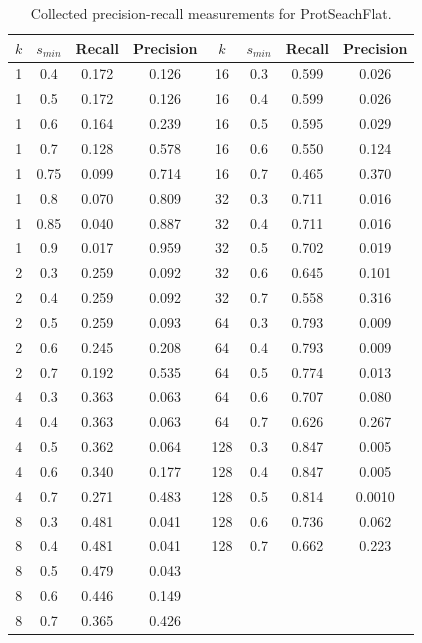 \documentclass[twoside,a4paper]{master}
\begin{document}

\appendix
\noappendicestocpagenum
\addappheadtotoc

\begin{table}
\begin{center}
\begin{tabular}{|c|c|c|c|c|c|c|c|}
\hline
\(k\) & \(s_{min}\) & Recall & Precision & \(k\) & \(s_{min}\) & Recall & Precision \\
\hline
1&0.4&0.172&0.126&16&0.3&0.599&0.026\\
1&0.5&0.172&0.126&16&0.4&0.599&0.026\\
1&0.6&0.164&0.239&16&0.5&0.595&0.029\\
1&0.7&0.128&0.578&16&0.6&0.550&0.124\\
1&0.75&0.099&0.714&16&0.7&0.465&0.370\\
1&0.8&0.070&0.809&32&0.3&0.711&0.016\\
1&0.85&0.040&0.887&32&0.4&0.711&0.016\\
1&0.9&0.017&0.959&32&0.5&0.702&0.019\\
2&0.3&0.259&0.092&32&0.6&0.645&0.101\\
2&0.4&0.259&0.092&32&0.7&0.558&0.316\\
2&0.5&0.259&0.093&64&0.3&0.793&0.009\\
2&0.6&0.245&0.208&64&0.4&0.793&0.009\\
2&0.7&0.192&0.535&64&0.5&0.774&0.013\\
4&0.3&0.363&0.063&64&0.6&0.707&0.080\\
4&0.4&0.363&0.063&64&0.7&0.626&0.267\\
4&0.5&0.362&0.064&128&0.3&0.847&0.005\\
4&0.6&0.340&0.177&128&0.4&0.847&0.005\\
4&0.7&0.271&0.483&128&0.5&0.814&0.0010\\
8&0.3&0.481&0.041&128&0.6&0.736&0.062\\
8&0.4&0.481&0.041&128&0.7&0.662&0.223\\
8&0.5&0.479&0.043&&&&\\
8&0.6&0.446&0.149&&&&\\
8&0.7&0.365&0.426&&&&\\
\hline
\end{tabular}
\caption{Collected precision-recall measurements for ProtSeachFlat.}
\label{tab:pr_flat}
\end{center}
\end{table}
\end{document}
